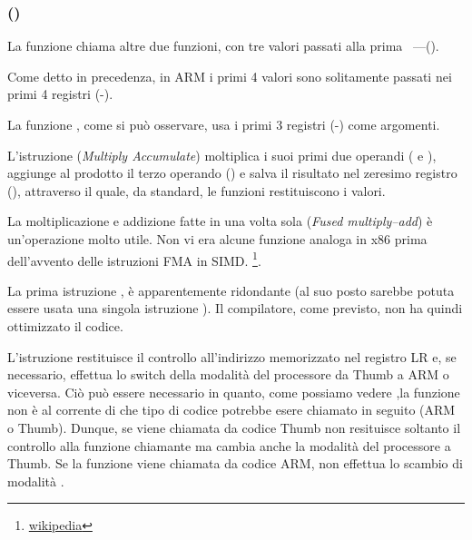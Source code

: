 \subsubsection{\NonOptimizingKeilVI (\ARMMode)}



La funzione \main chiama altre due funzioni, con tre valori passati alla prima ~---(\ttf).

Come detto in precedenza, in ARM i primi 4 valori sono solitamente passati nei primi 4 registri (-).

La funzione \ttf, come si può osservare, usa i primi 3 registri (-) come argomenti.

L'istruzione  (\emph{Multiply Accumulate}) 
moltiplica i suoi primi due operandi ( e ), aggiunge al prodotto il terzo operando () e salva il risultato
nel zeresimo registro (), attraverso il quale, da standard, le funzioni restituiscono i valori.

La moltiplicazione e addizione fatte in una volta sola (\emph{Fused multiply–add}) è un'operazione molto utile. 
Non vi era alcune funzione analoga in x86 prima dell'avvento delle istruzioni FMA in SIMD.
\footnote{\href{https://en.wikipedia.org/wiki/FMA_instruction_set}{wikipedia}}.

La prima istruzione , 
è apparentemente ridondante (al suo posto sarebbe potuta essere usata una singola istruzione ). 
Il compilatore, come previsto, non ha quindi ottimizzato il codice.


L'istruzione  restituisce il controllo all'indirizzo memorizzato nel registro \ac{LR} e, se necessario, 
effettua lo switch della modalità del processore da Thumb a ARM o viceversa.
Ciò può essere necessario in quanto, come possiamo vedere ,la funzione \ttf non è al corrente di che tipo di codice potrebbe esere chiamato in seguito (ARM o Thumb).
Dunque, se viene chiamata da codice Thumb  non resituisce soltanto il controllo alla funzione chiamante ma cambia anche la modalità del processore a Thumb. 
Se la funzione viene chiamata da codice ARM, non effettua lo scambio di modalità .

